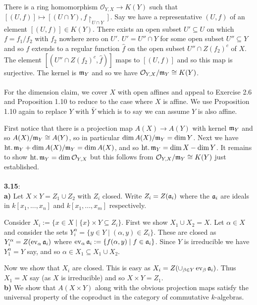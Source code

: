 \documentclass[12pt]{article}
\numberwithin{thm}{subsection}
\numberwithin{defn}{subsection}
\numberwithin{lemma}{subsection}
\numberwithin{example}{subsection}
\numberwithin{notation}{subsection}
\numberwithin{cor}{subsection}
\numberwithin{remark}{subsection}
\numberwithin{condition}{subsection}
\numberwithin{question}{subsection}
\numberwithin{construction}{subsection}
\numberwithin{construction}{subsection}
\numberwithin{construction}{subsection}
\newcommand{\call}[1]{\mathcal{#1}}
\newcommand{\lto}{\longrightarrow}
\begin{document}
There is a ring homomorphism $\call{O}_{Y,X} \lto K(Y)$ such that $[(U,f)] \mapsto [(U \cap Y), f\restriction_{U \cap Y}]$. Say we have a representative $(U,f)$ of an element $[(U,f)] \in K(Y)$. There exists an open subset $U' \subseteq U$ on which $f = f_1/f_2$ with $f_2$ nowhere zero on $U'$. $U' = U'' \cap Y$ for some open subset $U'' \subseteq Y$ and so $f$ extends to a regular function $\hat{f}$ on the open subset $U'' \cap Z(f_2)^c$ of $X$. The element $[(U'' \cap Z(f_2)^c, \hat{f})]$ maps to $[(U,f)]$ and so this map is surjective. The kernel is $\frak{m}_Y$ and so we have $\call{O}_{Y,X}/\frak{m}_Y \cong K(Y)$.\\\\
%
For the dimension claim, we cover $X$ with open affines and appeal to Exercise 2.6 and Proposition 1.10 to reduce to the case where $X$ is affine. We use Proposition 1.10 again to replace $Y$ with $\bar{Y}$ which is to say we can assume $Y$ is also affine.

First notice that there is a projection map $A(X) \lto A(Y)$ with kernel $\frak{m}_Y$ and so $A(X)/\frak{m}_Y \cong A(Y)$, so in particular $\operatorname{dim}A(X)/\frak{m}_Y = \operatorname{dim}Y$. Next we have $\operatorname{ht.}\frak{m}_Y + \operatorname{dim}A(X)/\frak{m}_Y = \operatorname{dim}A(X)$, and so $\operatorname{ht.}\frak{m}_Y = \operatorname{dim}X - \operatorname{dim}Y$. It remains to show $\operatorname{ht.}\frak{m}_Y = \operatorname{dim}\call{O}_{Y,X}$ but this follows from $\call{O}_{Y,X}/\frak{m}_Y \cong K(Y)$ just established.\\\\
%
\textbf{3.15}:\\
\textbf{a)} Let $X \times Y = Z_1 \cup Z_2$ with $Z_i$ closed. Write $Z_i = Z(\frak{a}_i)$ where the $\frak{a}_i$ are ideals in $k[x_1,...,x_n]$ and $k[x_1,...,x_m]$ respectively.

Consider $X_i := \lbrace x \in X \mid \lbrace x \rbrace \times Y \subseteq Z_i \rbrace$. First we show $X_1 \cup X_2 = X$. Let $\alpha \in X$ and consider the sets $Y^\alpha_i = \lbrace y \in Y \mid (\alpha,y) \in Z_i\rbrace$. These are closed as $Y^\alpha_i = Z(\operatorname{ev}_\alpha\frak{a}_i)$ where $\operatorname{ev}_\alpha\frak{a}_i := \lbrace f(\alpha,y) \mid f \in \frak{a}_i\rbrace$. Since $Y$ is irreducible we have $Y^\alpha_1 = Y$ say, and so $\alpha \in X_1 \subseteq X_1 \cup X_2$.

Now we show that $X_i$ are closed. This is easy as $X_i = Z(\cup_{\beta \in Y}\operatorname{ev}_\beta\frak{a}_i)$. Thus $X_1 = X$ say (as $X$ is irreducible) and so $X \times Y = Z_1$.\\
%
\textbf{b)} We show that $A(X\times Y)$ along with the obvious projection maps satisfy the universal property of the coproduct in the category of commutative $k$-algebras.
\end{document}

